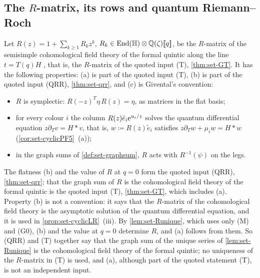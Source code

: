 
\subsection{The \texorpdfstring{$R$}{R}-matrix, its rows and quantum Riemann--Roch}
\label{sec:set-rows}

\begin{defn}
\label{def:set-rows}
Let $R(z)=1+\sum_{k\geq1}R_kz^k$, $R_k\in\operatorname{End}(\mathbb{H})\otimes\mathbb{Q}(\zeta)[\![ q ]\!]$, be the $R$-matrix of the semisimple cohomological field theory of the formal quintic along the line $t=T(q)H$ \cite[Section~4.1]{GJR18}, that is, the $R$-matrix of the quoted input (T), \cref{thm:set-GT}. It has the following properties: (a) is part of the quoted input (T), (b) is part of the quoted input (QRR), \cref{thm:set-qrr}, and (c) is Givental's convention:
\begin{itemize}
\item[(a)] $R$ is symplectic: $R(-z)^T\eta\,R(z)=\eta$, as matrices in the flat basis;
\item[(b)] for every colour $i$ the column $R(z)\tilde e_i\mathrm{e}^{u_i/z}$ solves the quantum differential equation $z\partial_Tv=H*v$, that is, $w\coloneqq R(z)\tilde e_i$ satisfies $z\partial_Tw+\mu_iw=H*w$ (\cref{cor:set-cyclicPF5}~(a));
\item[(c)] in the graph sums of \cref{def:set-graphsum}, $R$ acts with $R^{-1}(\psi)$ on the legs.
\end{itemize}
The flatness (b) and the value of $R$ at $q=0$ form the quoted input (QRR), \cref{thm:set-qrr}; that the graph sum of $R$ is the cohomological field theory of the formal quintic is the quoted input (T), \cref{thm:set-GT}, which includes (a). Property (b) is not a convention: it says that the $R$-matrix of the cohomological field theory is the asymptotic solution of the quantum differential equation, and it is used in \cref{prop:set-cyclicLR}~(iii). By \cref{lem:set-Runique}, which uses only (M) and (G0), (b) and the value at $q=0$ determine $R$, and (a) follows from them. So (QRR) and (T) together say that the graph sum of the unique series of \cref{lem:set-Runique} is the cohomological field theory of the formal quintic; no uniqueness of the $R$-matrix in (T) is used, and (a), although part of the quoted statement (T), is not an independent input.


\end{defn}
